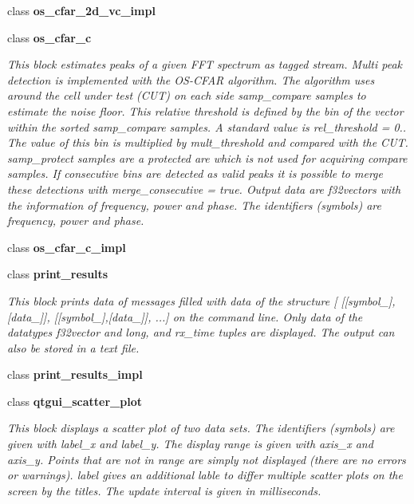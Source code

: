 \begin{DoxyCompactItemize}
class {\bf os\+\_\+cfar\+\_\+2d\+\_\+vc\+\_\+impl}
\item 
class {\bf os\+\_\+cfar\+\_\+c}
\begin{DoxyCompactList}\small\item\em This block estimates peaks of a given F\+FT spectrum as tagged stream. Multi peak detection is implemented with the O\+S-\/\+C\+F\+AR algorithm. The algorithm uses around the cell under test (C\+UT) on each side samp\+\_\+compare samples to estimate the noise floor. This relative threshold is defined by the bin of the vector within the sorted samp\+\_\+compare samples. A standard value is rel\+\_\+threshold = 0.. The value of this bin is multiplied by mult\+\_\+threshold and compared with the C\+UT. samp\+\_\+protect samples are a protected are which is not used for acquiring compare samples. If consecutive bins are detected as valid peaks it is possible to merge these detections with merge\+\_\+consecutive = true. Output data are f32vectors with the information of frequency, power and phase. The identifiers (symbols) are \textquotesingle{}frequency\textquotesingle{}, \textquotesingle{}power\textquotesingle{} and \textquotesingle{}phase\textquotesingle{}. \end{DoxyCompactList}\item 
class {\bf os\+\_\+cfar\+\_\+c\+\_\+impl}
\item 
class {\bf print\+\_\+results}
\begin{DoxyCompactList}\small\item\em This block prints data of messages filled with data of the structure [ [[symbol\+\_],[data\+\_]], [[symbol\+\_],[data\+\_]], ...] on the command line. Only data of the datatypes f32vector and long, and rx\+\_\+time tuples are displayed. The output can also be stored in a text file. \end{DoxyCompactList}\item 
class {\bf print\+\_\+results\+\_\+impl}
\item 
class {\bf qtgui\+\_\+scatter\+\_\+plot}
\begin{DoxyCompactList}\small\item\em This block displays a scatter plot of two data sets. The identifiers (symbols) are given with label\+\_\+x and label\+\_\+y. The display range is given with axis\+\_\+x and axis\+\_\+y. Points that are not in range are simply not displayed (there are no errors or warnings). label gives an additional lable to differ multiple scatter plots on the screen by the titles. The update interval is given in milliseconds. \end{DoxyCompactList}\item 

\end{DoxyCompactItemize}

